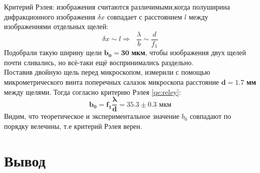 Критерий Рэлея: изображения считаются различимыми,когда полуширина дифракционного изображения $\delta x$ совпадает с расстоянием $l$ между изображениями отдельных щелей:
\begin{equation}
    \delta x \sim l \Rightarrow \text{   } \frac{\lambda}{b} \sim \frac{d}{f_1}\label{qe:reley}
\end{equation}
\indent
Подобрали такую ширину щели $\mathbf{b_0 = 30}$ \textbf{ мкм}, чтобы изображения двух щелей почти сливались, но всё-таки ещё воспринимались раздельно.
\\\indent
Поставив двойную щель перед микроскопом, измерили с помощью
микрометрического винта поперечных салазок микроскопа расстояние $\mathbf{d = 1.7}$ \textbf{мм} между щелями. Тогда согласно критерию Рэлея \ref{qe:reley}:
$$ 
\mathbf{b_0 = f_1\frac{\lambda}{d} = 35.3\pm 0.3}\textbf{ мкм}
$$
Видим, что теоретическое и экспериментальное значение $b_0$ совпадают по порядку велечины, т.е критерий Рэлея верен.


\section*{Вывод}
